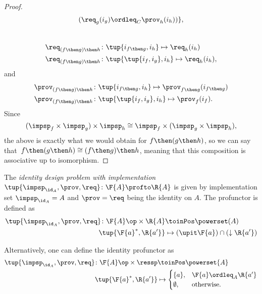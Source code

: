 {\begin{proof}
\begin{equation}
\begin{aligned}
      (\req_g(i_g) \ordleq_{C} \prov_h(i_h))
      \},
    \end{aligned}
  \end{equation}
  ~
  \begin{equation}
    \begin{aligned}
      \req_{(f\then g)\then h}  &\colon  \tup{i_{f\then g},i_h} \mapsto \req_h(i_h) \\
      \req_{(f\then g)\then h}  &\colon  \tup{\tup{i_f, i_g},i_h} \mapsto \req_h(i_h),
    \end{aligned}
  \end{equation}
  and
  \begin{equation}
    \begin{aligned}
      \prov_{(f\then g)\then h}  &\colon  \tup{i_{f\then g},i_h} \mapsto \prov_{f\then g}(i_{f\then g})\\
      \prov_{(f\then g)\then h}  &\colon  \tup{\tup{i_f, i_g},i_h} \mapsto \prov_f(i_f).
    \end{aligned}
  \end{equation}
  Since
  \begin{equation}
  (\impsp_f \times \impsp_g)
    \times \impsp_{h} \cong  \impsp_f \times (\impsp_g \times \impsp_{h}),
  \end{equation}
  the above is exactly what we would obtain for $f\then (g\then h)$, so we can say
  that~$f\then(g\then h)\cong (f\then g)\then h$, meaning that this composition is associative up to isomorphism.
\end{proof}

\begin{definition}
  \label{def:identitydpi}
  The \emph{identity design problem with implementation}~$\tup{\impsp_{\id_A},\prov,\req} \colon \F{A} \profto \R{A}$ is given by implementation set $\impsp_{\id_A} = A$ and $\prov=\req$ being
  the identity on $A$. The profunctor is defined as
  \begin{align}
    \tup{\impsp_{\id_A},\prov,\req} \colon \F{A}\op \times \R{A} &\toinPos \powerset(A) \\
    \tup{\F{a}^*,\R{a'}} &\mapsto (\upit \F{a}) \cap (\downarrow \R{a'})
  \end{align}
\end{definition}
\begin{remark}
  Alternatively, one can define the identity profunctor as
  \begin{align}
    \tup{\impsp_{\id_A},\prov,\req}\colon \F{A}\op \times \ressp &\toinPos \powerset{A}\\
    \tup{\F{a}^*,\R{a'}}&\mapsto
    \begin{cases}
      \{a\},&\F{a}\ordleq_A \R{a'}\\
      \emptyset, &\text{otherwise}.
    \end{cases}
  \end{align}
\end{remark}

}
